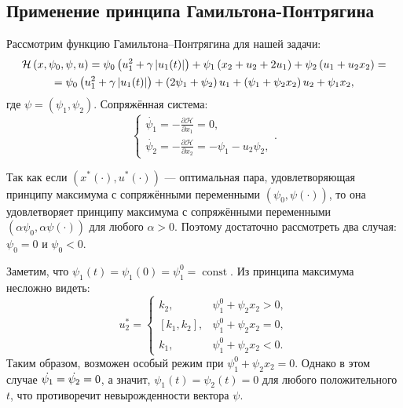 \documentclass[11pt]{article}
\newcommand*{\hm}[1]{#1\nobreak\discretionary{}{\hbox{$\mathsurround=0pt #1$}}{}}
\newcommand\abs[1]{\left\lvert#1\right\rvert}
\begin{document}
\subsection{Применение принципа Гамильтона-Понтрягина}
Рассмотрим функцию Гамильтона--Понтрягина для нашей задачи:
\begin{gather}
\mathcal{H}\left( x, \psi_0, \psi, u \right) = \psi_0 \left( u_1^2 + \gamma \abs{u_1(t)} \right) + \psi_1 \left(x_2 + u_2 + 2u_1 \right) + \psi_2 \left( u_1 + u_2 x_2 \right) = \notag \\
= \psi_0 \left( u_1^2 + \gamma \abs{u_1(t)} \right) + \left( 2\psi_1 + \psi_2 \right) u_1 + \left( \psi_1 + \psi_2 x_2 \right) u_2 + \psi_1 x_2,
\end{gather}
где $\psi = \left( \psi_1, \psi_2 \right)$. %
Сопряжённая система:
$$
\left\{
\begin{aligned}
\dot{\psi_1} = -\frac{\partial \mathcal{H}}{\partial x_1} = 0, \\
\dot{\psi_2} = -\frac{\partial \mathcal{H}}{\partial x_2} = -\psi_1 - u_2 \psi_2,
\end{aligned} \right..
$$

Так как если $\left( x^*(\cdot), u^*(\cdot) \right)$ --- оптимальная пара, удовлетворяющая принципу максимума с сопряжёнными переменными $\left( \psi_0, \psi(\cdot) \right)$, то она удовлетворяет принципу максимума с сопряжёнными переменными $\left( \alpha\psi_0, \alpha\psi(\cdot) \right)$ для любого $\alpha > 0$. Поэтому достаточно рассмотреть два случая: $\psi_0 = 0$ и $\psi_0 < 0$.

Заметим, что $\psi_1(t) = \psi_1(0) = \psi_1^0 = \operatorname{const}$. Из принципа максимума несложно видеть:
$$
u_2^* =
\begin{cases}
k_2, & \psi_1^0 + \psi_2 x_2 > 0, \\
[k_1, k_2], & \psi_1^0 + \psi_2 x_2 = 0, \\
k_1, & \psi_1^0 + \psi_2 x_2 < 0.
\end{cases}
$$
Таким образом, возможен особый режим при $\psi_1^0 + \psi_2 x_2 = 0$. Однако в этом случае $\dot{\psi_1} \hm= \dot{\psi_2} = 0$, а значит, $\psi_1(t) = \psi_2(t) = 0$ для любого положительного $t$, что противоречит невырожденности вектора $\psi$.
\end{document}
